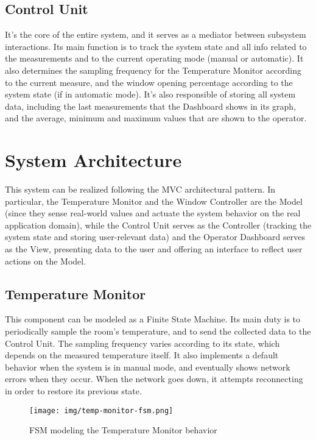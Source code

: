 \documentclass[a4paper,12pt]{report}
\begin{document}
	\section{Control Unit}
	It's the core of the entire system, and it serves as a mediator between subsystem interactions. Its main function is to track the system state and all info related to the measurements and to the current operating mode (manual or automatic). It also determines the sampling frequency for the Temperature Monitor according to the current measure, and the window opening percentage according to the system state (if in automatic mode). It's also responsible of storing all system data, including the last measurements that the Dashboard shows in its graph, and the average, minimum and maximum values that are shown to the operator.
	
	\chapter{System Architecture}
	This system can be realized following the MVC architectural pattern. In particular, the Temperature Monitor and the Window Controller are the Model (since they sense real-world values and actuate the system behavior on the real application domain), while the Control Unit serves as the Controller (tracking the system state and storing user-relevant data) and the Operator Dashboard serves as the View, presenting data to the user and offering an interface to reflect user actions on the Model.
	\section{Temperature Monitor}
	This component can be modeled as a Finite State Machine. Its main duty is to periodically sample the room's temperature, and to send the collected data to the Control Unit. The sampling frequency varies according to its state, which depends on the measured temperature itself. It also implements a default behavior when the system is in manual mode, and eventually shows network errors when they occur. When the network goes down, it attempts reconnecting in order to restore its previous state.
	\begin{figure}[H]
		\centering{}
		\texttt{[image: img/temp-monitor-fsm.png]}
		\caption{FSM modeling the Temperature Monitor behavior}
		\label{img:temp-monitor-fsm}
	\end{figure}
\end{document}
